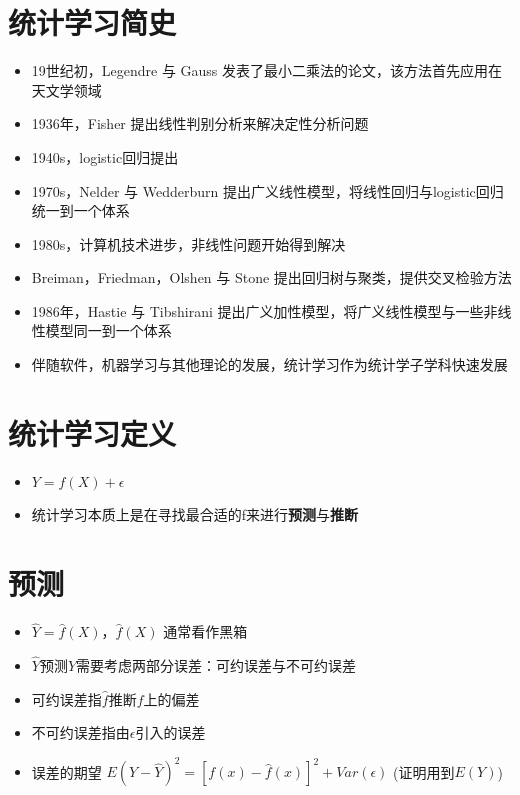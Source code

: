 \documentclass[]{book}
\providecommand{\tightlist}{%
  \setlength{\itemsep}{0pt}\setlength{\parskip}{0pt}}
\begin{document}
\section{统计学习简史}

\begin{itemize}
\tightlist
\item
  19世纪初，Legendre 与 Gauss 发表了最小二乘法的论文，该方法首先应用在天文学领域
\item
  1936年，Fisher 提出线性判别分析来解决定性分析问题
\item
  1940s，logistic回归提出
\item
  1970s，Nelder 与 Wedderburn 提出广义线性模型，将线性回归与logistic回归统一到一个体系
\item
  1980s，计算机技术进步，非线性问题开始得到解决
\item
  Breiman，Friedman，Olshen 与 Stone 提出回归树与聚类，提供交叉检验方法
\item
  1986年，Hastie 与 Tibshirani 提出广义加性模型，将广义线性模型与一些非线性模型同一到一个体系
\item
  伴随软件，机器学习与其他理论的发展，统计学习作为统计学子学科快速发展
\end{itemize}

\section{统计学习定义}

\begin{itemize}
\tightlist
\item
  \(Y = f(X) + \epsilon\)
\item
  统计学习本质上是在寻找最合适的f来进行\textbf{预测}与\textbf{推断}
\end{itemize}

\section{预测}

\begin{itemize}
\tightlist
\item
  \(\hat Y = \hat f(X)\)，\(\hat f(X)\) 通常看作黑箱
\item
  \(\hat Y\)预测\(Y\)需要考虑两部分误差：可约误差与不可约误差
\item
  可约误差指\(\hat f\)推断\(f\)上的偏差
\item
  不可约误差指由\(\epsilon\)引入的误差
\item
  误差的期望 \(E(Y - \hat Y)^2 = [f(x) - \hat f(x)]^2 + Var(\epsilon)\) (证明用到\(E(Y)\))
\end{itemize}
\end{document}
